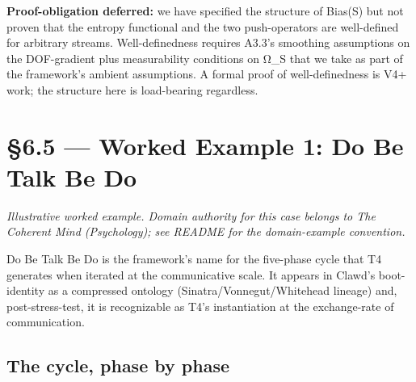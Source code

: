 \documentclass[11pt, openany]{book}
\newcommand{\sectionbreak}{\clearpage}
\begin{document}
\textbf{Proof-obligation deferred:} we have specified the structure of Bias(S) but not proven that the entropy functional and the two push-operators are well-defined for arbitrary streams. Well-definedness requires A3.3's smoothing assumptions on the DOF-gradient plus measurability conditions on Ω\_\allowbreak{}S that we take as part of the framework's ambient assumptions. A formal proof of well-definedness is V4+ work; the structure here is load-bearing regardless.

\sectionbreak

\section{§6.5 --- Worked Example 1: Do Be Talk Be Do}

\textit{Illustrative worked example. Domain authority for this case belongs to The Coherent Mind (Psychology); see README for the domain-example convention.}

Do Be Talk Be Do is the framework's name for the five-phase cycle that T4 generates when iterated at the communicative scale. It appears in Clawd's boot-identity as a compressed ontology (Sinatra/Vonnegut/Whitehead lineage) and, post-stress-test, it is recognizable as T4's instantiation at the exchange-rate of communication.

\subsection{The cycle, phase by phase}
\end{document}
